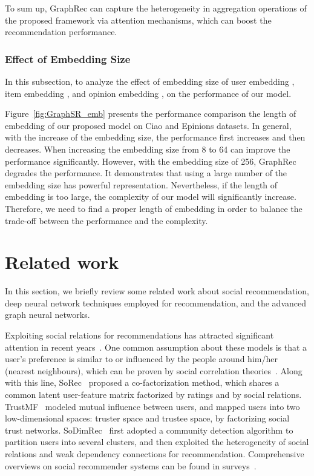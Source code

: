 \documentclass[sigconf]{acmart} \copyrightyear{2019}
\begin{document}
To sum up, GraphRec can capture the heterogeneity in aggregation operations of the proposed framework via attention mechanisms, which can boost the recommendation performance.

\subsubsection{Effect of Embedding Size}
In this subsection, to analyze the effect of embedding size  of user embedding  , item embedding , and opinion embedding , on the performance of our model. 

Figure~\ref{fig:GraphSR_emb} presents the performance comparison  the length of embedding of our proposed model on Ciao and Epinions datasets. In general, with the increase of the embedding size, the performance first increases and then decreases. When increasing the embedding size from 8 to 64 can improve the performance significantly. However, with the embedding size of 256, GraphRec degrades the performance. It demonstrates that using a large number of the embedding size has powerful representation. Nevertheless, if the length of embedding is too large, the complexity of our model will significantly increase. Therefore, we need to find a proper length of embedding in order to balance the trade-off between the performance and the complexity.





 \section{Related work}
\label{sec:relatedwork}

In this section, we briefly review some related work about social recommendation, deep neural network techniques employed for recommendation, and the advanced graph neural networks.

Exploiting social relations for recommendations has attracted significant attention in recent years~\cite{tang2016recommendations, tang2013exploiting,yang2017social}. One common assumption about these models is that a user's preference is similar to or influenced by the people around him/her (nearest neighbours), which can be proven by social correlation theories~\cite{marsden1993network, mcpherson2001birds}. Along with this line, SoRec~\cite{ma2008sorec} proposed a co-factorization method, which shares a common latent user-feature matrix factorized by ratings and by social relations.  TrustMF~\cite{yang2017social} modeled mutual influence between users, and mapped users into two low-dimensional spaces: truster space and trustee space, by factorizing social trust networks.
SoDimRec~\cite{tang2016recommendation} first adopted a community detection algorithm to partition users into several clusters, and then exploited the heterogeneity of social relations and weak dependency connections for recommendation. Comprehensive overviews on social recommender systems can be found in surveys~\citep{tang2013social}.
\end{document}

